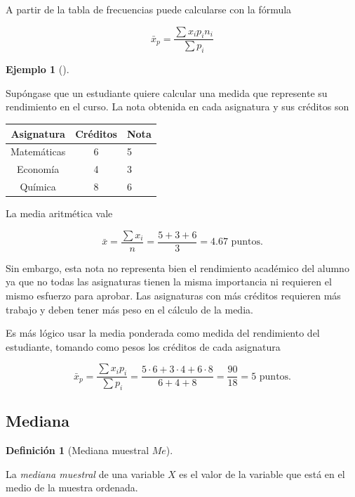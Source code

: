 \documentclass[
  spanish,
  a4paper,
]{scrreport}
\newcounter{none} %
\theoremstyle{plain}
\theoremstyle{definition}
\newtheorem{example}{Ejemplo}[chapter]
\theoremstyle{definition}
\newtheorem{definition}{Definición}[chapter]
\theoremstyle{remark}
\begin{document}
A partir de la tabla de frecuencias puede calcularse con la fórmula

\[\bar{x}_p = \frac{\sum x_ip_in_i}{\sum p_i}\]

\begin{example}[]\protect\hypertarget{exm-media-ponderada}{}\label{exm-media-ponderada}

Supóngase que un estudiante quiere calcular una medida que represente su
rendimiento en el curso. La nota obtenida en cada asignatura y sus
créditos son

{\def\LTcaptype{none} %
\begin{longtable}[]{@{}ccl@{}}
\toprule\noalign{}
Asignatura & Créditos & Nota \\
\midrule\noalign{}
\endhead
\bottomrule\noalign{}
\endlastfoot
Matemáticas & 6 & 5 \\
Economía & 4 & 3 \\
Química & 8 & 6 \\
\end{longtable}
}

La media aritmética vale

\[\bar{x} = \frac{\sum x_i}{n} = \frac{5+3+6}{3}= 4.67 \text{ puntos}.\]

Sin embargo, esta nota no representa bien el rendimiento académico del
alumno ya que no todas las asignaturas tienen la misma importancia ni
requieren el mismo esfuerzo para aprobar. Las asignaturas con más
créditos requieren más trabajo y deben tener más peso en el cálculo de
la media.

Es más lógico usar la media ponderada como medida del rendimiento del
estudiante, tomando como pesos los créditos de cada asignatura

\[
\bar{x}_p = \frac{\sum x_ip_i}{\sum p_i} = \frac{5\cdot 6+3\cdot 4+6\cdot 8}{6+4+8}= \frac{90}{18} = 5 \text{ puntos}.
\]

\end{example}

\subsection{Mediana}\label{mediana}

\begin{definition}[Mediana muestral
\(Me\)]\protect\hypertarget{def-mediana}{}\label{def-mediana}

La \emph{mediana muestral} de una variable \(X\) es el valor de la
variable que está en el medio de la muestra ordenada.

\end{definition}
\end{document}
